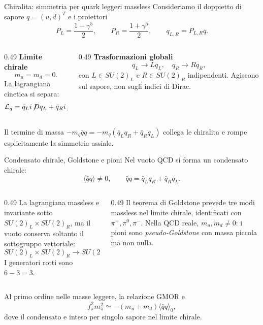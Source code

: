 \begin{frame}{Chiralita: simmetria per quark leggeri massless}
\small
Consideriamo il doppietto di sapore $q=(u,d)^T$ e i proiettori
\[
P_L=\frac{1-\gamma^5}{2},\qquad
P_R=\frac{1+\gamma^5}{2},\qquad q_{L,R}=P_{L,R}q.
\]
\begin{columns}[T,onlytextwidth]
\begin{column}{0.49\textwidth}
\textbf{Limite chirale}
\[
m_u=m_d=0.
\]
La lagrangiana cinetica si separa:
\[
\mathcal L_q=\bar q_Li\!\not\!D q_L+
\bar q_Ri\!\not\!D q_R.
\]
\end{column}
\begin{column}{0.49\textwidth}
\textbf{Trasformazioni globali}
\[
q_L\longrightarrow Lq_L,
\quad q_R\longrightarrow Rq_R,
\]
con $L\in SU(2)_L$ e $R\in SU(2)_R$
indipendenti. Agiscono sul sapore,
non sugli indici di Dirac.
\end{column}
\end{columns}
\medskip
Il termine di massa $-m_q\bar q q=-m_q(\bar q_Lq_R+\bar q_Rq_L)$
collega le chiralita e rompe esplicitamente la simmetria assiale.
\end{frame}

\begin{frame}{Condensato chirale, Goldstone e pioni}
\small
Nel vuoto QCD si forma un condensato chirale:
\[
\langle\bar q q\rangle\neq0,
\qquad\bar q q=\bar q_Lq_R+\bar q_Rq_L.
\]
\begin{columns}[T,onlytextwidth]
\begin{column}{0.49\textwidth}
La lagrangiana massless e invariante sotto
$SU(2)_L\times SU(2)_R$, ma il vuoto
conserva soltanto il sottogruppo vettoriale:
\[
SU(2)_L\times SU(2)_R\to SU(2)_V.
\]
I generatori rotti sono $6-3=3$.
\end{column}
\begin{column}{0.49\textwidth}
Il teorema di Goldstone prevede tre
modi massless nel limite chirale,
identificati con $\pi^+,\pi^0,\pi^-$.
\medskip
Nella QCD reale, $m_u,m_d\ne0$:
i pioni sono \emph{pseudo-Goldstone}
con massa piccola ma non nulla.
\end{column}
\end{columns}
\medskip
Al primo ordine nelle masse leggere, la relazione GMOR e
\[
f_\pi^2m_\pi^2\simeq-(m_u+m_d)\langle\bar q q\rangle_0,
\]
dove il condensato e inteso per singolo sapore nel limite chirale.
\end{frame}

